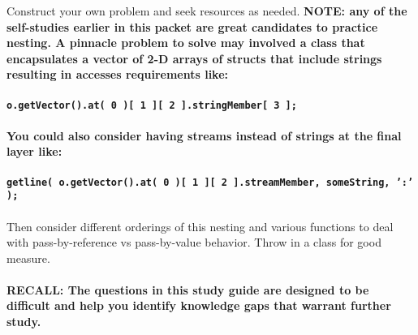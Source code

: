 \documentclass[addpoints,12pt]{exam}
\newcommand{\Soln}[1]{{\color{red}{SOLUTION: #1}}}%
\newcommand{\SolnNo}{\Soln{No solutions provided for this sample, it is up to you to verify your understanding of the topic using the resources that are available to you. Ask your peers, use office hours, use \hyperlink{https://edstem.org/us/courses/72170/discussion}{EdStem}.}}
\begin{document}
\begin{questions}
    \newpage
    
 Construct your own problem and seek resources as needed. \textbf{NOTE: any of the self-studies earlier in this packet are great candidates to practice nesting. A pinnacle problem to solve may involved a class that encapsulates a vector of 2-D arrays of structs that include strings resulting in accesses requirements like:\\ \\ \texttt{o.getVector().at( 0 )[ 1 ][ 2 ].stringMember[ 3 ];}\\ \\ You could also consider having streams instead of strings at the final layer like:\\ \\ \texttt{getline( o.getVector().at( 0 )[ 1 ][ 2 ].streamMember, someString, ':' );}}\\ \\Then consider different orderings of this nesting and various functions to deal with pass-by-reference vs pass-by-value behavior. Throw in a class for good measure. 
\\
\\
\textbf{RECALL: The questions in this study guide are designed to be difficult and help you identify knowledge gaps that warrant further study.} 
    \newpage

\end{questions}
\end{document}
